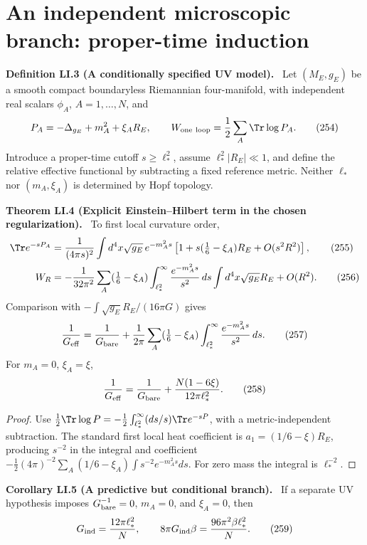 \documentclass[11pt,a4paper,oneside]{book}
\newcommand{\statement}[3]{\par\medskip\noindent\textbf{#1 #2 (#3).}\ }
\begin{document}
\section{An independent microscopic branch: proper-time induction}
\statement{Definition}{LI.3}{A conditionally specified UV model}
Let $(M_E,g_E)$ be a smooth compact boundaryless Riemannian four-manifold, with independent real scalars $\phi_A$, $A=1,\ldots,N$, and
\begin{equation}P_A=-\Delta_{g_E}+m_A^2+\xi_AR_E,\qquad W_{\rm one\ loop}=\frac12\sum_A\Tr\log P_A.\tag{254}\end{equation}
Introduce a proper-time cutoff $s\ge\ell_*^2$, assume $\ell_*^2|R_E|\ll1$, and define the relative effective functional by subtracting a fixed reference metric. Neither $\ell_*$ nor $(m_A,\xi_A)$ is determined by Hopf topology.
\statement{Theorem}{LI.4}{Explicit Einstein--Hilbert term in the chosen regularization}
To first local curvature order,
\begin{align}\Tr e^{-sP_A}&=\frac1{(4\pi s)^2}\int d^4x\sqrt{g_E}\,e^{-m_A^2s}\left[1+s(\tfrac16-\xi_A)R_E+O(s^2R^2)\right],\tag{255}\\
W_R&=-\frac1{32\pi^2}\sum_A(\tfrac16-\xi_A)\int_{\ell_*^2}^\infty\frac{e^{-m_A^2s}}{s^2}\,ds\int d^4x\sqrt{g_E}R_E+O(R^2).\tag{256}\end{align}
Comparison with $-\int\sqrt{g_E}R_E/(16\pi G)$ gives
\begin{equation}\frac1{G_{\rm eff}}=\frac1{G_{\rm bare}}+\frac1{2\pi}\sum_A(\tfrac16-\xi_A)\int_{\ell_*^2}^\infty\frac{e^{-m_A^2s}}{s^2}\,ds.\tag{257}\end{equation}
For $m_A=0$, $\xi_A=\xi$,
\begin{equation}\frac1{G_{\rm eff}}=\frac1{G_{\rm bare}}+\frac{N(1-6\xi)}{12\pi\ell_*^2}.\tag{258}\end{equation}
\begin{proof}
Use $\frac12\Tr\log P=-\frac12\int_{\ell_*^2}^\infty(ds/s)\Tr e^{-sP}$, with a metric-independent subtraction. The standard first local heat coefficient is $a_1=(1/6-\xi)R_E$, producing $s^{-2}$ in the integral and coefficient $-\frac12(4\pi)^{-2}\sum_A(1/6-\xi_A)\int s^{-2}e^{-m_A^2s}ds$. For zero mass the integral is $\ell_*^{-2}$.
\end{proof}
\statement{Corollary}{LI.5}{A predictive but conditional branch}
If a separate UV hypothesis imposes $G_{\rm bare}^{-1}=0$, $m_A=0$, and $\xi_A=0$, then
\begin{equation}G_{\rm ind}=\frac{12\pi\ell_*^2}{N},\qquad8\pi G_{\rm ind}\beta=\frac{96\pi^2\beta\ell_*^2}{N}.\tag{259}\end{equation}
\end{document}
